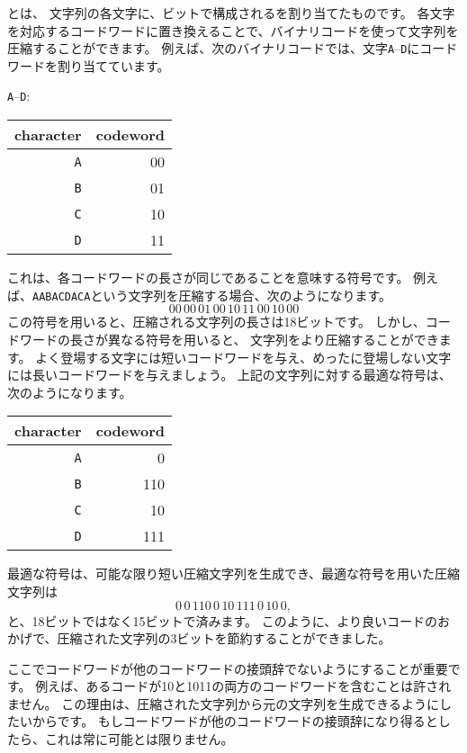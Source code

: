 
とは、
文字列の各文字に、ビットで構成されるを割り当てたものです。
各文字を対応するコードワードに置き換えることで、バイナリコードを使って文字列を圧縮することができます。
例えば、次のバイナリコードでは、文字\texttt{A}–\texttt{D}にコードワードを割り当てています。

\texttt{A}–\texttt{D}:
\begin{center}
\begin{tabular}{rr}
character & codeword \\
\hline
\texttt{A} & 00 \\
\texttt{B} & 01 \\
\texttt{C} & 10 \\
\texttt{D} & 11 \\
\end{tabular}
\end{center}
これは、各コードワードの長さが同じであることを意味する符号です。
例えば、\texttt{AABACDACA}という文字列を圧縮する場合、次のようになります。
\[00\,00\,01\,00\,10\,11\,00\,10\,00\]
この符号を用いると、圧縮される文字列の長さは18ビットです。
しかし、コードワードの長さが異なる符号を用いると、
文字列をより圧縮することができます。
よく登場する文字には短いコードワードを与え、めったに登場しない文字には長いコードワードを与えましょう。
上記の文字列に対する最適な符号は、次のようになります。

\begin{center}
\begin{tabular}{rr}
character & codeword \\
\hline
\texttt{A} & 0 \\
\texttt{B} & 110 \\
\texttt{C} & 10 \\
\texttt{D} & 111 \\
\end{tabular}
\end{center}
最適な符号は、可能な限り短い圧縮文字列を生成でき、最適な符号を用いた圧縮文字列は
\[0\,0\,110\,0\,10\,111\,0\,10\,0,\]
と、18ビットではなく15ビットで済みます。
このように、より良いコードのおかげで、圧縮された文字列の3ビットを節約することができました。

ここでコードワードが他のコードワードの接頭辞でないようにすることが重要です。
例えば、あるコードが10と1011の両方のコードワードを含むことは許されません。
この理由は、圧縮された文字列から元の文字列を生成できるようにしたいからです。
もしコードワードが他のコードワードの接頭辞になり得るとしたら、これは常に可能とは限りません。

